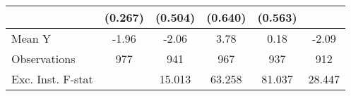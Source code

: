 {\begin{tabular}{l*{5}{c}}
            &     (0.267)         &     (0.504)         &     (0.640)         &     (0.563)         &                     \\
\midrule
Mean Y      &       -1.96         &       -2.06         &        3.78         &        0.18         &       -2.09         \\
Observations&         977         &         941         &         967         &         937         &         912         \\
Exc. Inst. F-stat&                     &      15.013         &      63.258         &      81.037         &      28.447         \\
\bottomrule
\end{tabular}
}
